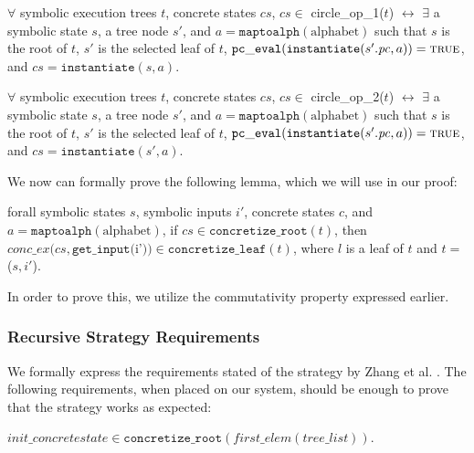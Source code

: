 \begin{definition}
$\forall$ symbolic execution trees $t$,  concrete states $cs$,
$cs \in$ circle\_op\_1($t$) $\leftrightarrow$ 
$\exists$ a symbolic state $s$, a tree node $s'$, and $a = \mathtt{maptoalph}(\mathrm{alphabet})$ such that
$s$ is the root of $t$, $s'$ is the selected leaf of $t$, 
$\mathtt{pc\_eval} (\mathtt{instantiate} (s'.\mathit{pc}, a)) = \mathtt{\textsc{true}}$, and 
$cs = \mathtt{instantiate}(s, a)$.
\end{definition}

\begin{definition}
$\forall$ symbolic execution trees $t$,  concrete states $cs$,
$cs \in$ circle\_op\_2($t$) $\leftrightarrow$ 
$\exists$ a symbolic state $s$, a tree node $s'$, and $a = \mathtt{maptoalph}(\mathrm{alphabet})$ such that
$s$ is the root of $t$, $s'$ is the selected leaf of $t$, 
$\mathtt{pc\_eval} (\mathtt{instantiate} (s'.\mathit{pc}, a)) = \mathtt{\textsc{true}}$, and 
$cs = \mathtt{instantiate}(s', a)$.
\end{definition}


We now can formally prove the following lemma, which we will use in our proof:
\begin{lemma} \label{cop}
forall symbolic states $s$, symbolic inputs $i'$, concrete states $c$, and $a = \mathtt{maptoalph}(\mathrm{alphabet})$,
if $cs \in \mathtt{concretize\_root}(t)$,
then 
$conc\_ex(cs, \mathtt{get\_input} ($i'$)) \in \mathtt{concretize\_leaf}(t)$,
where $l$ is a leaf of $t$ and $t = $ \symexecution($s, i'$).
\end{lemma}

In order to prove this, we utilize the commutativity property expressed earlier.


\subsubsection{Recursive Strategy Requirements}
We formally express the requirements stated of the strategy by Zhang et al. \cite{zhang2018recursive}.
The following requirements, when placed on our system, should be enough to prove that the strategy works as expected:

\setcounter{property}{0}
\renewcommand{\theproperty}{Z.\arabic{property}}
\begin{property}
  \label{prop:startinit}
$init\_concrete state \in \mathtt{concretize\_root}(first\_elem (tree\_list))$.
\end{property}

